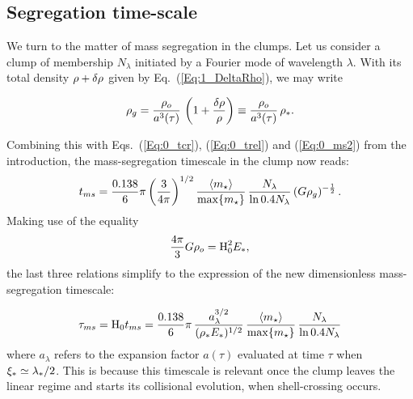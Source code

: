 \subsection{Segregation time-scale} 
\label{Sec:Timescales} 
We turn to the matter of mass segregation in the clumps. Let us consider a clump of membership $N_\lambda$ initiated by a Fourier mode of wavelength $\lambda$. With its total density $\rho + \delta\rho$ given by Eq.~(\ref{Eq:1_DeltaRho}), we may write 

\begin{equation}
 \rho_g = \frac{\rho_o}{a^3(\tau)} \, \left( 1 + \frac{\delta\rho}{\rho} \right) \equiv  \frac{\rho_o}{a^3(\tau)} \, \rho_\ast.
 \end{equation}
 
Combining this with Eqs.~(\ref{Eq:0_tcr}), (\ref{Eq:0_trel}) and (\ref{Eq:0_ms2}) from the introduction, the mass-segregation timescale in the clump now reads:
\begin{equation}
 t_{ms} = \frac{0.138}{6}\pi \left(\frac{3}{4\pi}\right)^{1/2} \frac{\langle m_\star\rangle}{\max\{m_\star\}} \, \frac{N_\lambda}{\ln 0.4 N_\lambda} \, (G\rho_g)^{-\frac{1}{2}}\, . \end{equation}
Making use of the equality 
\begin{equation}
\frac{4\pi}{3} G\rho_o = {\textrm{H}}_0^2 E_\ast ,
\end{equation} 
the last three relations simplify to the expression of the new dimensionless mass-segregation timescale:

\begin{equation}\label{Eqn:Taums} 
\tau_{ms} = {\textrm{H}}_0 t_{ms} = \frac{0.138}{6} \pi \, \frac{a_\lambda^{3/2}}{(\rho_\ast E_\ast)^{1/2}} \, \frac{\langle m_\star\rangle}{\max\{m_\star\}} \, \frac{N_\lambda}{\ln 0.4 N_\lambda} 
\end{equation}
where $a_\lambda$ refers to the expansion factor $a(\tau)$ evaluated at time $\tau$ when $\xi_\ast \simeq \lambda_\ast/2$. This is because this timescale is relevant once the clump leaves the linear regime and starts its collisional evolution, when shell-crossing occurs.


